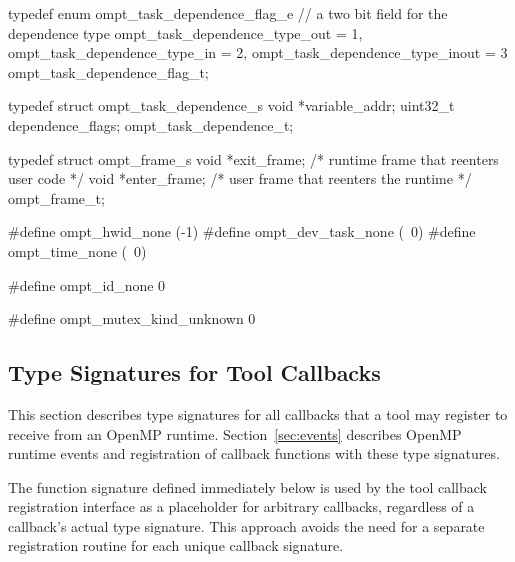\documentclass{article}
\begin{document}
\begin{boxedcode}
typedef enum ompt\_task\_dependence\_flag\_e {
  // a two bit field for the dependence type
  ompt\_task\_dependence\_type\_out       = 1,
  ompt\_task\_dependence\_type\_in        = 2,
  ompt\_task\_dependence\_type\_inout     = 3
} ompt\_task\_dependence\_flag\_t;

typedef struct ompt\_task\_dependence\_s {
  void *variable\_addr;
  uint32\_t  dependence\_flags;
} ompt\_task\_dependence\_t;

typedef struct ompt\_frame\_s {
  void *exit\_frame;                           /* runtime frame that reenters user code       */
  void *enter\_frame;                          /* user frame that reenters the runtime        */
} ompt\_frame\_t;

#define ompt\_hwid\_none                (-1)
#define ompt\_dev\_task\_none            (~0)
#define ompt\_time\_none                (~0)

#define ompt\_id\_none                  0

#define ompt\_mutex\_kind\_unknown       0
\end{boxedcode}
\clearpage

\subsection{Type Signatures for Tool Callbacks}
\label{appendix:ompt-types:callbacks}
This section describes type signatures for all  callbacks that a tool may register to receive from an OpenMP runtime. Section~\ref{sec:events} describes OpenMP runtime events and registration of
callback functions with these type signatures.

The function signature   defined immediately below is used by the tool callback registration interface as a placeholder for arbitrary callbacks,
 regardless of a callback's actual type signature. This approach avoids the need for a separate registration routine for each unique callback signature. 
\end{document}
